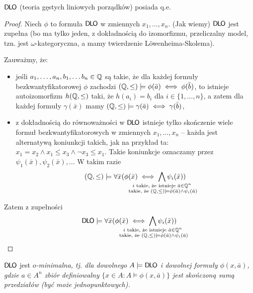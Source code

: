 \documentclass{article}
\begin{document}
\begin{tw}
	$\mathsf{D \mkern-1.5mu L \mkern-1.8mu O}$ (teoria gęstych liniowych porządków) posiada q.e.	
\end{tw}
\begin{proof}
	Niech $\phi$ to formuła $\mathsf{D \mkern-1.5mu L \mkern-1.8mu O}$ w zmiennych $x_1, \ldots, x_n$.
	(Jak wiemy) $\mathsf{D \mkern-1.5mu L \mkern-1.8mu O}$ jest zupełna (bo ma tylko jeden, z dokładnością do izomorfizmu, przeliczalny model, tzn. jest $\omega$-kategoryczna, a mamy twierdzenie Löwenheima-Skolema).

	Zauważmy, że:
	\begin{itemize}
		\item jeśli $a_1, \ldots, a_n, b_1, \ldots b_n \in \mathbb{Q}$ są takie, że dla każdej formuły bezkwantyfikatorowej $\phi$ zachodzi $(\mathbb{Q}, \leq) \models \phi(\bar{a}) \iff \phi(\bar{b})$, to istnieje autoizomorfizm $h(\mathbb{Q}, \leq)$ taki, że $h(a_i) = b_i$ dla $i \in \{1, \ldots, n\}$, a zatem dla każdej formuły $\gamma(\bar{x})$ mamy $(\mathbb{Q}, \leq) \models \gamma(\bar{a}) \iff \gamma(\bar{b})$,
		\item z dokładnością do równoważności w $\mathsf{D \mkern-1.5mu L \mkern-1.8mu O}$ istnieje tylko skończenie wiele formuł bezkwantyfikatorowych w zmiennych $x_1, \ldots, x_n$ -- każda jest alternatywą koniunkcji takich, jak na przykład ta: $x_1 = x_2 \wedge x_1 \leq x_3 \wedge \neg x_3 \leq x_1$.
			Takie koniunkcje oznaczamy przez $\psi_1(\bar{x}), \psi_2(\bar{x}), \ldots$
			W takim razie 
			\[(\Q, \leq) \models \forall \bar{x} (\phi(\bar{x}) \iff \bigwedge_{\mathclap{\substack{i \text{ takie, że istnieje } \bar{a} \in \Q^n \\ \text{ takie, że }(\Q, \leq) \models \phi(\bar{a}) \wedge \psi_i(\bar{a})}}} \psi_i(\bar{x}))\]
	\end{itemize}
	Zatem z zupełności 
			\[\DLO \models \forall \bar{x} (\phi(\bar{x}) \iff \bigwedge_{\mathclap{\substack{i \text{ takie, że istnieje } \bar{a} \in \Q^n \\ \text{ takie, że }(\Q, \leq) \models \phi(\bar{a}) \wedge \psi_i(\bar{a})}}} \psi_i(\bar{x}))\]
\end{proof}

\begin{wn}
	$\mathsf{D \mkern-1.5mu L \mkern-1.8mu O}$ jest \em{$o$-minimalna}, tj. dla dowolnego $A \models \mathsf{D \mkern-1.5mu L \mkern-1.8mu O}$ i dowolnej formuły $\phi(x,\bar{a})$, gdzie $a \in A^n$ zbiór definiowalny $\{x \in A \colon  A \models \phi(x,\bar{a})\}$ jest skończoną sumą przedziałów (być może jednopunktowych).
\end{wn} 
\end{document}
